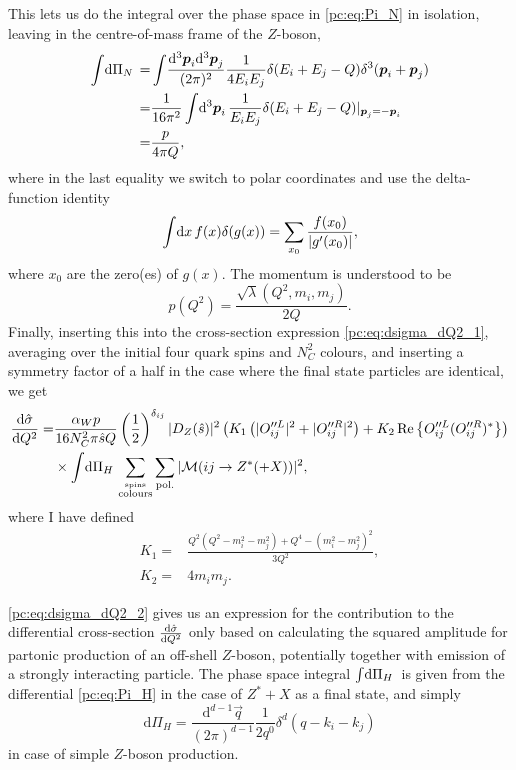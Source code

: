 \documentclass[../main.tex]{subfiles}
\begin{document}
This lets us do the integral over the phase space in \cref{pc:eq:Pi_N} in isolation, leaving in the centre-of-mass frame of the \(Z\)-boson,
\begin{align}
  \nonumber
  \integral{\Pi_N} = & \int\! \frac{\mathrm{d}^3\vec{p}_i \mathrm{d}^3\vec{p}_j}{(2\pi)^2} \frac{1}{4E_i E_j} \delta(E_i+E_j-Q) \delta^3(\vec{p}_i+\vec{p}_j) \\
  \nonumber
  =                  & \frac{1}{16\pi^2} \integral{^3\vec{p}_i} \frac{1}{E_i E_j} \delta(E_i + E_j - Q)|_{\vec{p}_j = -\vec{p}_i}                             \\
  =                  & \frac{p}{4\pi Q},
\end{align}
where in the last equality we switch to polar coordinates and use the delta-function identity
\begin{equation}
  \integral{x} f(x) \delta(g(x)) = \sum_{x_0} \frac{f(x_0)}{|g^\prime(x_0)|},
\end{equation}
where \(x_0\) are the zero(es) of \(g(x)\).
The momentum is understood to be
\begin{equation}
  p(Q^2) = \frac{\sqrt{\lambda}(Q^2, m_i, m_j)}{2Q}.
\end{equation}
Finally, inserting this into the cross-section expression \cref{pc:eq:dsigma_dQ2_1}, averaging over the initial four quark spins and \(N_C^2\) colours, and inserting a symmetry factor of a half in the case where the final state particles are identical, we get
\begin{align}
  \label{pc:eq:dsigma_dQ2_2}
  \nonumber
  \d[Q^2]{\hat\sigma} = & \frac{\alpha_W p}{16 N_C^2 \pi \hat{s} Q} \pclosed{\frac{1}{2}}^{\delta_{ij}} |D_Z(\hat{s})|^2 \pclosed{K_1\pclosed{|O_{ij}^{\prime\prime L}|^2+|O_{ij}^{\prime\prime R}|^2} + K_2 \Re{O_{ij}^{\prime\prime L} (O_{ij}^{\prime\prime R})^\ast}} \\
                        & \times \integral{\Pi_H} \sum_{\stackrel{\text{spins}}{\text{colours}}} \sum_\text{pol.}|\M(ij \to Z^\ast (+ X))|^2,
\end{align}
where I have defined
\begin{subequations}
  \begin{align}
    K_1 = & \frac{Q^2(Q^2-m_i^2-m_j^2) + Q^4 - (m_i^2-m_j^2)^2}{3Q^2}, \\
    K_2 = & 4m_i m_j.
  \end{align}
\end{subequations}

\cref{pc:eq:dsigma_dQ2_2} gives us an expression for the contribution to the differential cross-section \(\d[Q^2]{\hat\sigma}\) only based on calculating the squared amplitude for partonic production of an off-shell \(Z\)-boson, potentially together with emission of a strongly interacting particle.
The phase space integral \(\integral{\Pi_H}\) is given from the differential \cref{pc:eq:Pi_H} in the case of \(Z^\ast+X\) as a final state, and simply
\begin{equation}
  \label{pc:eq:dPi_H_2to1}
  \mathrm{d}\Pi_H = \frac{\mathrm{d}^{d-1}\vec{q}}{(2\pi)^{d-1}} \frac{1}{2q^0} \delta^d(q - k_i - k_j)
\end{equation}
in case of simple \(Z\)-boson production.
\end{document}
